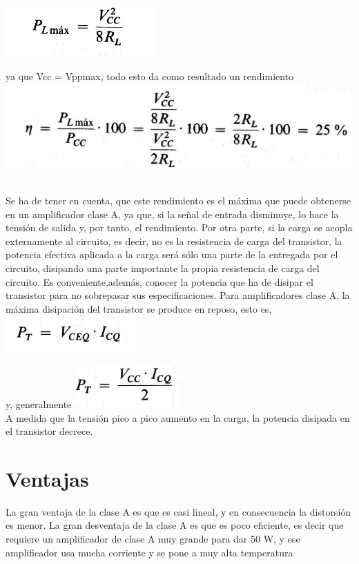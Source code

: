 \documentclass[10pt,a4paper]{article}
\begin{document}
\centering
\includegraphics[scale=.50]{pote.png}\\ 
\raggedright
ya que Vcc = Vppmax, todo esto da como resultado un rendimiento\\ 
\centering
\includegraphics[scale=.50]{rend.png}\\\\
\raggedright
Se ha de tener en cuenta, que este rendimiento es el máxima que puede obtenerse en un amplificador clase A, ya que, si la señal de entrada disminuye, lo hace la tensión de salida y, por tanto, el rendimiento. Por otra parte, si la carga se acopla externamente al circuito, es decir, no es la resistencia de carga del transistor, la potencia efectiva aplicada a la carga será sólo una parte de la entregada por el circuito, disipando una parte importante la propia resistencia de carga del circuito.
Es conveniente,además, conocer la potencia que ha de disipar el transistor para no sobrepasar sus especificaciones. Para amplificadores clase A, la máxima disipación del transistor se produce en reposo, esto es,\includegraphics[scale=.80]{pt.png}\\ 
\raggedright
y, generalmente
\centering
\includegraphics[scale=1]{gr.png}\\
A medida que la tensión pico a pico aumento en la carga, la potencia disipada en el transistor decrece.\\
\raggedright
\section{Ventajas}
La gran ventaja de la clase A es que es casi lineal, y en consecuencia la distorsión es menor. La gran desventaja de la clase A es que es poco eficiente, es decir que requiere un amplificador de clase A muy grande para dar 50 W, y ese amplificador usa mucha corriente y se pone a muy alta temperatura
\end{document}
